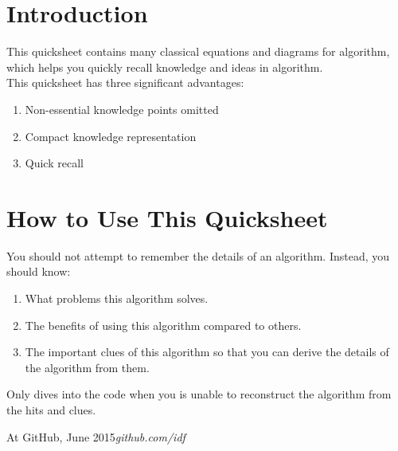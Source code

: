 %
%

\preface
\section*{Introduction}
This quicksheet contains many classical equations and diagrams for algorithm, which helps you quickly recall knowledge and ideas in algorithm.\\

This quicksheet has three significant advantages:
\begin{enumerate}
\item Non-essential knowledge points omitted
\item Compact knowledge representation
\item Quick recall
\end{enumerate}
\section*{How to Use This Quicksheet}
You should not attempt to remember the details of an algorithm. Instead, you should know:
\begin{enumerate}
\item What problems this algorithm solves.
\item The benefits of using this algorithm compared to others.
\item The important clues of this algorithm so that you can derive the details of the algorithm from them.
\end{enumerate}
Only dives into the code when you is unable to reconstruct the algorithm from the hits and clues. 

\vspace{\baselineskip}
\begin{flushright}\noindent
At GitHub, June 2015\hfill {\it github.com/idf} \\
\end{flushright}
